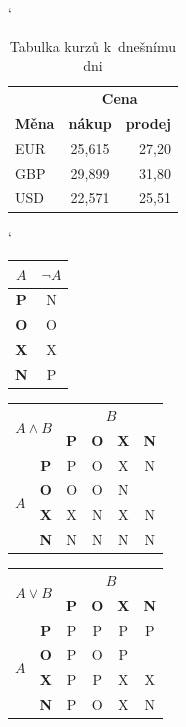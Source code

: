 \documentclass[a4paper,11pt]{article}
\begin{document}
\bigskip
\begin{table}[h]
\catcode`
\centering

\begin{tabular}{|l|c|r|} \hline & \multicolumn{2}{|c|}{\textbf{Cena}} \\ \cline{2-3} \textbf{Měna} & \textbf{nákup} & \textbf{prodej}\\ \hline EUR & 25,615 & 27,20 \\ GBP & 29,899 & 31,80 \\ USD & 22,571 & 25,51 \\ \hline
\end{tabular}

\caption{Tabulka kurzů k~dnešnímu dni}
\label{mena}
\end{table}
\medskip
\begin{table}[h]
\catcode`
\centering
\begin{tabular}{|c|c|} \hline $A$ & $\neg A$ \\ \hline \textbf{P} & N \\ \hline \textbf{O} & O \\ \hline \textbf{X} & X \\ \hline \textbf{N} & P \\ \hline
\end{tabular}
\begin{tabular}{|c|c|c|c|c|c|} \hline \multicolumn{2}{|c|}{\multirow{2}{*}{$A \wedge B$}} & \multicolumn{4}{c|}{$B$} \\ \cline{3-6} \multicolumn{2}{|c|}{} & \textbf{P} & \textbf{O} & \textbf{X} & \textbf{N} \\ \hline \multirow{4}{*}{$A$} & \textbf{P} & P & O & X & N \\ \cline{2-6} & \textbf{O} & O & O & N & \\ \cline{2-6} & \textbf{X} & X & N & X & N \\ \cline{2-6} & \textbf{N} & N & N & N & N \\ \hline
\end{tabular}
\begin{tabular}{|c|c|c|c|c|c|} \hline \multicolumn{2}{|c|}{\multirow{2}{*}{$A \vee B$}} & \multicolumn{4}{c|}{$B$} \\ \cline{3-6} \multicolumn{2}{|c|}{} & \textbf{P} & \textbf{O} & \textbf{X} & \textbf{N} \\ \hline \multirow{4}{*}{$A$} & \textbf{P} & P & P & P & P \\ \cline{2-6} & \textbf{O} & P & O & P & \\ \cline{2-6} & \textbf{X} & P & P & X & X \\ \cline{2-6} & \textbf{N} & P & O & X & N \\ \hline

\end{tabular}
\end{table}
\end{document}
